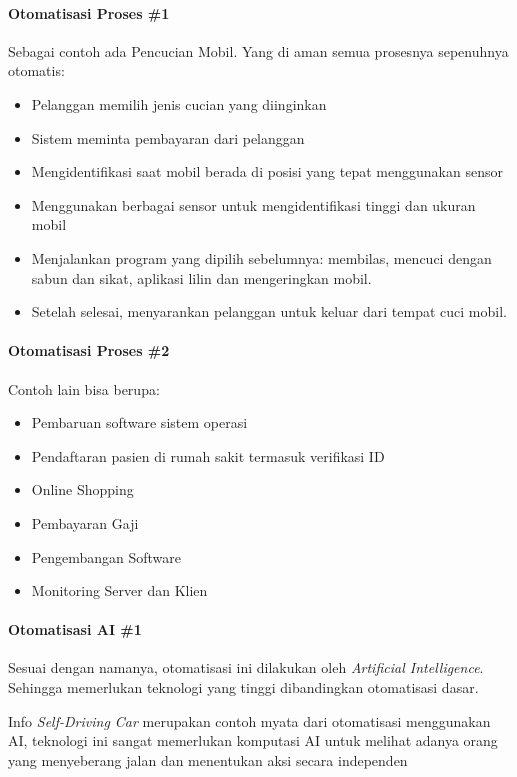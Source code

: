 \begin{frame}{\insertsectionhead}
	\framesubtitle{Otomatisasi Proses \#1}
	\justifying
	Sebagai contoh ada Pencucian Mobil. Yang di aman semua prosesnya sepenuhnya otomatis:
	\vfill
	\begin{itemize}
		\item Pelanggan memilih jenis cucian yang diinginkan
		\item Sistem meminta pembayaran dari pelanggan
		\item Mengidentifikasi saat mobil berada di posisi yang tepat menggunakan sensor
		\item Menggunakan berbagai sensor untuk mengidentifikasi tinggi dan ukuran mobil
		\item Menjalankan program yang dipilih sebelumnya: membilas, mencuci dengan sabun dan sikat, aplikasi lilin dan mengeringkan mobil.
		\item Setelah selesai, menyarankan pelanggan untuk keluar dari tempat cuci mobil.
	\end{itemize}
\end{frame}

\begin{frame}{\insertsectionhead}
	\framesubtitle{Otomatisasi Proses \#2}
	\justifying
	Contoh lain bisa berupa:
	\begin{itemize}
		\item Pembaruan software sistem operasi
		\item Pendaftaran pasien di rumah sakit termasuk verifikasi ID
		\item Online Shopping
		\item Pembayaran Gaji
		\item Pengembangan Software
		\item Monitoring Server dan Klien
	\end{itemize}
\end{frame}

\begin{frame}{\insertsectionhead}
	\framesubtitle{Otomatisasi AI \#1}
	\justifying
	Sesuai dengan namanya, otomatisasi ini dilakukan oleh \textit{Artificial Intelligence}. Sehingga memerlukan teknologi yang tinggi dibandingkan otomatisasi dasar. 
	\vfill
	\begin{block}{Info}
		\textit{Self-Driving Car}  merupakan contoh myata dari otomatisasi menggunakan AI, teknologi ini sangat memerlukan komputasi AI untuk melihat adanya orang yang menyeberang jalan dan menentukan aksi secara independen
	\end{block}
\end{frame}

